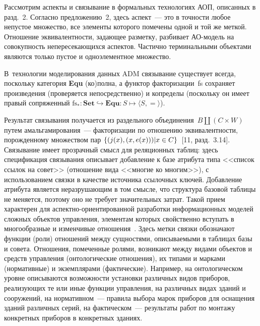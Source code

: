\begin{multicols}{2}
   \medskip
   
   Рассмотрим аспекты и связывание в формальных технологиях АОП, 
описанных в разд.~2. Со\-гласно предложению~2, здесь аспект~--- это в точности 
любое непустое множество, все элементы которого помечены одной и той же 
меткой. Отношение эквивалентности, задающее разметку, разбивает 
   АО-мо\-дель на совокупность непересекающихся аспектов. Частично 
терминальными объектами являются только пустое и одноэлементное 
множество. 

В~технологии моделирования данных ADM связывание существует 
всегда, поскольку категория \textbf{Equ} (ко)полна, а функтор 
факторизации~fs сохраняет произведения (проверяется непосредственно) и 
копределы (поскольку он имеет правый сопряженный $\mathrm{fs}_* : 
\mathbf{Set}\hookrightarrow \mathbf{Equ} : S \mapsto \langle S, =\rangle$). 

Результат связывания получается из раздельного объединения~$B\amalg 
(C\times  W)$ путем амальгамирования~--- факторизации по отношению 
эквивалентности, порожденному множеством пар $\{(j(x), (x, e(x))) \vert  x \hm\in 
C\}$~[11, разд.~3.14]. Связывание имеет прозрачный смысл для реляционных 
таблиц: здесь спецификация связывания описывает добавление к базе атрибута 
типа <<список ссылок на совет>> (отношение вида <<многие ко многим>>), с 
использованием связки в качестве источника ссылочных ключей. 
%
Добавление 
атрибута является неразрушающим в том смысле, что структура базовой 
таблицы не меняется, поэтому оно не требует значительных затрат. Такой 
прием характерен для ас\-пект\-но-ори\-ен\-ти\-ро\-ван\-ной разработки 
информационных моделей сложных объектов управления, элементам которых 
свойственно вступать в многообразные и изменчивые отношения~\cite{18-kov}. 
Здесь метки связки обозначают функции (роли) отношений между сущностями, 
описываемыми в таблицах базы и совета. Отношения, помеченные ролями, 
возникают между видами объектов и средств управ\-ле\-ния (онтологические 
отношения), их типами и марками (нормативные) и экземплярами 
(фактические). Например, на онтологическом уровне описываются 
возможности установки различных видов приборов, реализующих те или иные 
функции управления, на различных видах зданий и сооружений, на 
нормативном~--- правила выбора марок приборов для оснащения зданий 
различных серий, на фактическом~--- результаты работ по монтажу конкретных 
приборов в конкретных зданиях.
   

\end{multicols}
